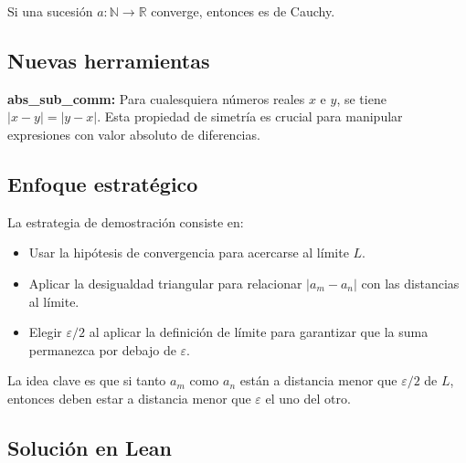 \begin{teorema}
Si una sucesión $a : \mathbb{N} \to \mathbb{R}$ converge, entonces es de Cauchy.
\end{teorema}

\subsection{Nuevas herramientas}

\textbf{abs\_sub\_comm:} Para cualesquiera números reales $x$ e $y$, se tiene $|x - y| = |y - x|$. Esta propiedad de simetría es crucial para manipular expresiones con valor absoluto de diferencias.

\subsection{Enfoque estratégico}

La estrategia de demostración consiste en:
\begin{itemize}
  \item Usar la hipótesis de convergencia para acercarse al límite $L$.
  \item Aplicar la desigualdad triangular para relacionar $|a_m - a_n|$ con las distancias al límite.
  \item Elegir $\varepsilon/2$ al aplicar la definición de límite para garantizar que la suma permanezca por debajo de $\varepsilon$.
\end{itemize}

La idea clave es que si tanto $a_m$ como $a_n$ están a distancia menor que $\varepsilon/2$ de $L$, entonces deben estar a distancia menor que $\varepsilon$ el uno del otro.

\subsection{Solución en Lean}

